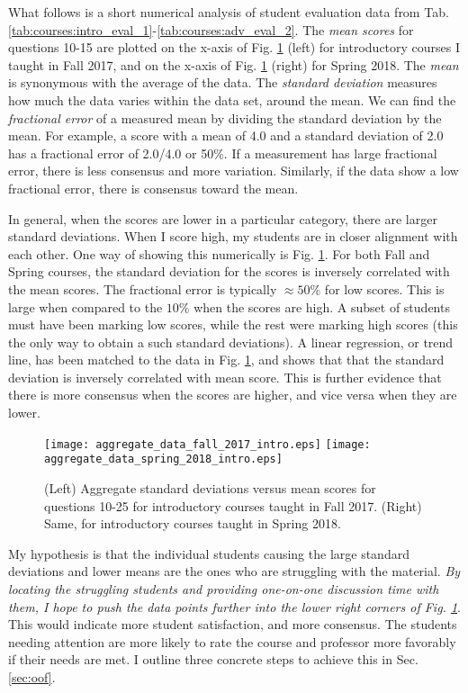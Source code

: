 \documentclass[../../main.tex]{subfiles}
\begin{document}
What follows is a short numerical analysis of student evaluation data from Tab. \ref{tab:courses:intro_eval_1}-\ref{tab:courses:adv_eval_2}.  The \textit{mean scores} for questions 10-15 are plotted on the x-axis of Fig. \ref{fig:ag_data} (left) for introductory courses I taught in Fall 2017, and on the x-axis of Fig. \ref{fig:ag_data} (right) for Spring 2018.  The \textit{mean} is synonymous with the average of the data.  The \textit{standard deviation} measures how much the data varies within the data set, around the mean.  We can find the \textit{fractional error} of a measured mean by dividing the standard deviation by the mean.  For example, a score with a mean of 4.0 and a standard deviation of 2.0 has a fractional error of 2.0/4.0 or 50\%. If a measurement has large fractional error, there is less consensus and more variation.  Similarly, if the data show a low fractional error, there is consensus toward the mean. \\ \hspace{0.1cm}

In general, when the scores are lower in a particular category, there are larger standard deviations.  When I score high, my students are in closer alignment with each other.  One way of showing this numerically is Fig. \ref{fig:ag_data}.  For both Fall and Spring courses, the standard deviation for the scores is inversely correlated with the mean scores.  The fractional error is typically $\approx 50$\% for low scores.  This is large when compared to the $10$\% when the scores are high.  A subset of students must have been marking low scores, while the rest were marking high scores (this the only way to obtain a such standard deviations).  A linear regression, or trend line, has been matched to the data in Fig. \ref{fig:ag_data}, and shows that that the standard deviation is inversely correlated with mean score.  This is further evidence that there is more consensus when the scores are higher, and vice versa when they are lower.

\begin{figure}[ht]
\centering
\texttt{[image: aggregate\_data\_fall\_2017\_intro.eps]}
\texttt{[image: aggregate\_data\_spring\_2018\_intro.eps]}
\caption{\label{fig:ag_data} (Left) Aggregate standard deviations versus mean scores for questions 10-25 for introductory courses taught in Fall 2017.  (Right) Same, for introductory courses taught in Spring 2018.}
\end{figure}

My hypothesis is that the individual students causing the large standard deviations and lower means are the ones who are struggling with the material.  \textit{By locating the struggling students and providing one-on-one discussion time with them, I hope to push the data points further into the lower right corners of Fig. \ref{fig:ag_data}}.  This would indicate more student satisfaction, and more consensus.  The students needing attention are more likely to rate the course and professor more favorably if their needs are met.  I outline three concrete steps to achieve this in Sec. \ref{sec:oof}.
\end{document}
